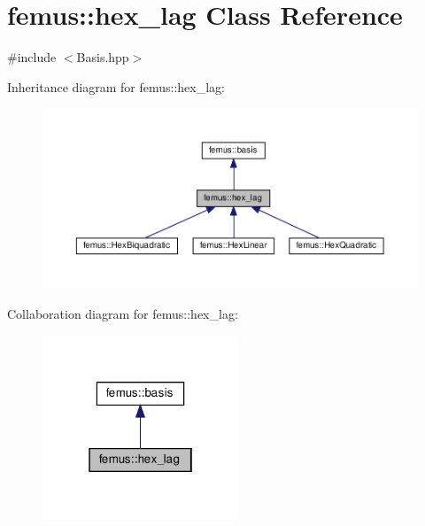 \hypertarget{classfemus_1_1hex__lag}{}\section{femus\+:\+:hex\+\_\+lag Class Reference}
\label{classfemus_1_1hex__lag}


{\ttfamily \#include $<$Basis.\+hpp$>$}



Inheritance diagram for femus\+:\+:hex\+\_\+lag\+:
\nopagebreak
\begin{figure}[H]
\begin{center}
\leavevmode
\includegraphics[width=350pt]{classfemus_1_1hex__lag__inherit__graph}
\end{center}
\end{figure}


Collaboration diagram for femus\+:\+:hex\+\_\+lag\+:
\nopagebreak
\begin{figure}[H]
\begin{center}
\leavevmode
\includegraphics[width=166pt]{classfemus_1_1hex__lag__coll__graph}
\end{center}
\end{figure}
